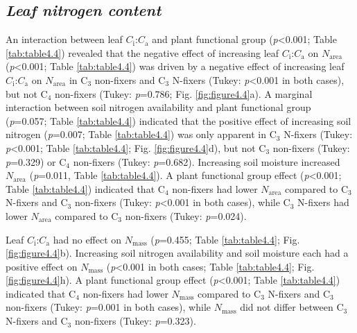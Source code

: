 \subsection{\textit{Leaf nitrogen content}}
\noindent An interaction between leaf $C_\mathrm{i}$:$C_\mathrm{a}$ and plant functional group (\textit{p}<0.001; Table \ref{tab:table4.4}) revealed that the negative effect of increasing leaf $C_\mathrm{i}$:$C_\mathrm{a}$ on $N_\mathrm{area}$ (\textit{p}<0.001; Table \ref{tab:table4.4}) was driven by a negative effect of increasing leaf $C_\mathrm{i}$:$C_\mathrm{a}$ on $N_\mathrm{area}$ in C$_3$ non-fixers and C$_3$ N-fixers (Tukey: \textit{p}<0.001 in both cases), but not C$_4$ non-fixers (Tukey: \textit{p}=0.786; Fig. \ref{fig:figure4.4}a). A marginal interaction between soil nitrogen availability and plant functional group (\textit{p}=0.057; Table \ref{tab:table4.4}) indicated that the positive effect of increasing soil nitrogen (\textit{p}=0.007; Table \ref{tab:table4.4}) was only apparent in C$_3$ N-fixers (Tukey: \textit{p}<0.001; Table \ref{tab:table4.4}; Fig. \ref{fig:figure4.4}d), but not C$_3$ non-fixers (Tukey: \textit{p}=0.329) or C$_4$ non-fixers (Tukey: \textit{p}=0.682). Increasing soil moisture increased $N_\mathrm{area}$ (\textit{p}=0.011, Table \ref{tab:table4.4}). A plant functional group effect (\textit{p}<0.001; Table \ref{tab:table4.4}) indicated that C$_4$ non-fixers had lower $N_\mathrm{area}$ compared to C$_3$ N-fixers and C$_3$ non-fixers (Tukey: \textit{p}<0.001 in both cases), while C$_3$ N-fixers had lower $N_\mathrm{area}$ compared to C$_3$ non-fixers (Tukey: \textit{p}=0.024).

Leaf $C_\mathrm{i}$:$C_\mathrm{a}$ had no effect on $N_\mathrm{mass}$ (\textit{p}=0.455; Table \ref{tab:table4.4}; Fig. \ref{fig:figure4.4}b). Increasing soil nitrogen availability and soil moisture each had a positive effect on $N_\mathrm{mass}$ (\textit{p}<0.001 in both cases; Table \ref{tab:table4.4}; Fig. \ref{fig:figure4.4}h). A plant functional group effect (\textit{p}<0.001; Table \ref{tab:table4.4}) indicated that C$_4$ non-fixers had lower $N_\mathrm{mass}$ compared to C$_3$ N-fixers and C$_3$ non-fixers (Tukey: \textit{p}=0.001 in both cases), while $N_\mathrm{mass}$ did not differ between C$_3$ N-fixers and C$_3$ non-fixers (Tukey: \textit{p}=0.323).


